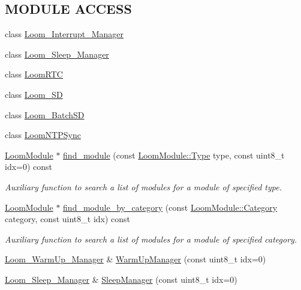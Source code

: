 \subsection*{M\+O\+D\+U\+LE A\+C\+C\+E\+SS}
\begin{DoxyCompactItemize}
\item 
class \hyperlink{class_loom_manager_a008d5139e80cc67e9facc1611e7e30be}{Loom\+\_\+\+Interrupt\+\_\+\+Manager}
\item 
class \hyperlink{class_loom_manager_a9d93d402309f8410307da6ff54acd40d}{Loom\+\_\+\+Sleep\+\_\+\+Manager}
\item 
class \hyperlink{class_loom_manager_ad460f63d437defbca6d2c4cf1b03f084}{Loom\+R\+TC}
\item 
class \hyperlink{class_loom_manager_a16fed8610f64b07f59a179e88627f381}{Loom\+\_\+\+SD}
\item 
class \hyperlink{class_loom_manager_a6e9a09b43cf35fd3138c6787b589f320}{Loom\+\_\+\+Batch\+SD}
\item 
class \hyperlink{class_loom_manager_ac23a5e689f21bc3c5dc04a499b9a905b}{Loom\+N\+T\+P\+Sync}
\item 
\hyperlink{class_loom_module}{Loom\+Module} $\ast$ \hyperlink{class_loom_manager_a139e842dcaa5ab84587bdb5bc75fd103}{find\+\_\+module} (const \hyperlink{class_loom_module_aee91d0a75140d51ee428fc2d4417d865}{Loom\+Module\+::\+Type} type, const uint8\+\_\+t idx=0) const 
\begin{DoxyCompactList}\small\item\em Auxiliary function to search a list of modules for a module of specified type. \end{DoxyCompactList}\item 
\hyperlink{class_loom_module}{Loom\+Module} $\ast$ \hyperlink{class_loom_manager_af8b532b1efb4ba887ceb09edea2d65a9}{find\+\_\+module\+\_\+by\+\_\+category} (const \hyperlink{class_loom_module_a0c6ecc60315f95af551138dc83567068}{Loom\+Module\+::\+Category} category, const uint8\+\_\+t idx) const 
\begin{DoxyCompactList}\small\item\em Auxiliary function to search a list of modules for a module of specified category. \end{DoxyCompactList}\item 
\hyperlink{class_loom___warm_up___manager}{Loom\+\_\+\+Warm\+Up\+\_\+\+Manager} \& \hyperlink{class_loom_manager_afb0cc398b36594b1389aaceb0873c9e9}{Warm\+Up\+Manager} (const uint8\+\_\+t idx=0)
\item 
\hyperlink{class_loom___sleep___manager}{Loom\+\_\+\+Sleep\+\_\+\+Manager} \& \hyperlink{class_loom_manager_aa18ec752187b173a50ff1ac4548100a5}{Sleep\+Manager} (const uint8\+\_\+t idx=0)

\end{DoxyCompactItemize}

